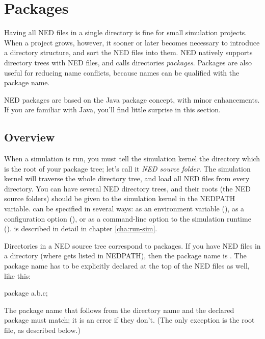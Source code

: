 \section{Packages}
\label{sec:ned-lang:packages}

Having all NED files in a single directory is fine for small simulation projects.
When a project grows, however, it sooner or later becomes
necessary to introduce a directory structure, and sort the NED files into
them. NED natively supports directory trees with NED files, and calls
directories \textit{packages}. Packages are also useful for reducing
name conflicts, because names can be qualified with the package name.

\begin{note}
    NED packages are based on the Java package concept, with minor
    enhancements. If you are familiar with Java, you'll find little
    surprise in this section.
\end{note}

\subsection{Overview}
\label{sec:ned-lang:packages-overview}

When a simulation is run, you must tell the simulation kernel the
directory which is the root of your package tree; let's call it
\textit{NED source folder}. The simulation kernel will traverse
the whole directory tree, and load all NED files from every directory.
You can have several NED directory trees, and their roots (the NED source
folders) should be given to the simulation kernel in the NEDPATH
variable.  can be specified in several ways: as an environment
variable (), as a configuration option (),
or as a command-line option to the simulation runtime ().  is
described in detail in chapter \ref{cha:run-sim}.

Directories in a NED source tree correspond to packages. If you have
NED files in a  directory (where 
gets listed in NEDPATH), then the package name is .
The package name has to be explicitly declared at the top of the NED
files as well, like this:

\begin{ned}
package a.b.c;
\end{ned}

The package name that follows from the directory name and the declared
package must match; it is an error if they don't. (The only exception
is the root  file, as described below.)

